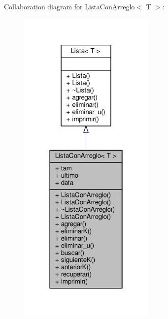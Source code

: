 Collaboration diagram for Lista\+Con\+Arreglo$<$ T $>$\+:
\nopagebreak
\begin{figure}[H]
\begin{center}
\leavevmode
\includegraphics[width=190pt]{class_lista_con_arreglo__coll__graph}
\end{center}
\end{figure}
